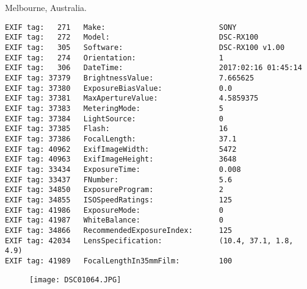 \section{\protect{}}
\noindent Melbourne, Australia.
\noindent
\begin{lstlisting}
EXIF tag:   271   Make:                          SONY
EXIF tag:   272   Model:                         DSC-RX100
EXIF tag:   305   Software:                      DSC-RX100 v1.00
EXIF tag:   274   Orientation:                   1
EXIF tag:   306   DateTime:                      2017:02:16 01:45:14
EXIF tag: 37379   BrightnessValue:               7.665625
EXIF tag: 37380   ExposureBiasValue:             0.0
EXIF tag: 37381   MaxApertureValue:              4.5859375
EXIF tag: 37383   MeteringMode:                  5
EXIF tag: 37384   LightSource:                   0
EXIF tag: 37385   Flash:                         16
EXIF tag: 37386   FocalLength:                   37.1
EXIF tag: 40962   ExifImageWidth:                5472
EXIF tag: 40963   ExifImageHeight:               3648
EXIF tag: 33434   ExposureTime:                  0.008
EXIF tag: 33437   FNumber:                       5.6
EXIF tag: 34850   ExposureProgram:               2
EXIF tag: 34855   ISOSpeedRatings:               125
EXIF tag: 41986   ExposureMode:                  0
EXIF tag: 41987   WhiteBalance:                  0
EXIF tag: 34866   RecommendedExposureIndex:      125
EXIF tag: 42034   LensSpecification:             (10.4, 37.1, 1.8, 4.9)
EXIF tag: 41989   FocalLengthIn35mmFilm:         100

\end{lstlisting}
\clearpage
\begin{figure}
\raggedleft
\texttt{[image: DSC01064.JPG]}
\end{figure}


\clearpage
